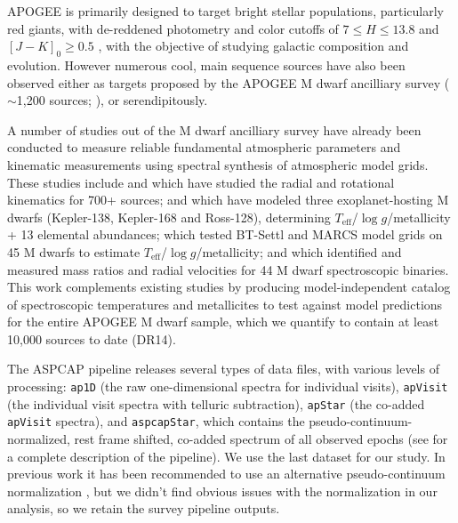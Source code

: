 \documentclass[twocolumn]{aastex62}
\newcommand{\teff}{T_{\mathrm{eff}}}
\newcommand{\logg}{\log g}
\begin{document}
APOGEE is primarily designed to target bright stellar populations, particularly red giants, with de-reddened photometry and color cutoffs of $7 \leq H \leq 13.8$ and $[J-K]_0 \geq 0.5$ \citep{Zasowski:2013}, with the objective of studying galactic composition and evolution. However numerous cool, main sequence sources have also been observed either as targets proposed by the APOGEE M dwarf ancilliary survey ($\sim$1,200 sources; \citealt{Desphande:2013}), or serendipitously. 

A number of studies out of the M dwarf ancilliary survey have already been conducted to measure reliable fundamental atmospheric parameters and kinematic measurements using spectral synthesis of atmospheric model grids. 
These studies include \citet{Desphande:2013} and \citet{Gilhool:2018} which have studied the radial and rotational kinematics for 700+ sources;
\citet{Souto:2017} and \citet{Souto:2018} which have modeled three exoplanet-hosting M dwarfs (Kepler-138, Kepler-168 and Ross-128), determining $\teff$/$\logg$/metallicity + 13 elemental abundances;
\citet{Rajpurohit:2018} which tested BT-Settl \citet{Allard:2012} and MARCS \citet{Gustafsson:2008} model grids on 45 M dwarfs to estimate $\teff$/$\logg$/metallicity;
and \citet{Skinner:2018} which identified and measured mass ratios and radial velocities for 44 M dwarf spectroscopic binaries.
This work complements existing studies by producing model-independent catalog of spectroscopic temperatures and metallicites to test against model predictions for the entire APOGEE M dwarf sample, which we quantify to contain at least 10,000 sources to date (DR14).

The ASPCAP pipeline releases several types of data files, with various levels of processing: {\tt\string ap1D} (the raw one-dimensional spectra for individual visits), {\tt\string apVisit} (the individual visit spectra with telluric subtraction), {\tt\string apStar} (the co-added {\tt\string apVisit} spectra), and {\tt\string aspcapStar}, which contains the pseudo-continuum-normalized, rest frame shifted, co-added spectrum of all observed epochs (see \citealt{Perez:2016} for a complete description of the pipeline). We use the last dataset for our study.
In previous work it has been recommended to use an alternative pseudo-continuum normalization \citep{Ness:2015}, but we didn't find obvious issues with the normalization in our analysis, so we retain the survey pipeline outputs.


\end{document}
